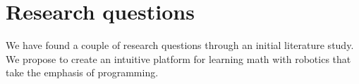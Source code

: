 \chapter{Research questions}
We have found a couple of research questions through an initial literature study. We propose to create an intuitive platform for learning math with robotics that take the emphasis of programming.